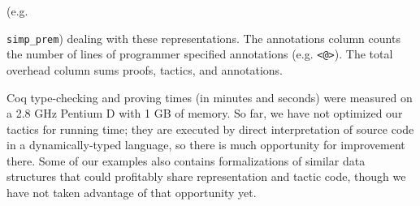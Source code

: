 \documentclass[preprint,nocopyrightspace]{sigplanconf}
\newcommand{\cd}[1]{\texttt{#1}}
\begin{document}
(e.g. {\cd{simp\_prem}) dealing with these representations.
The annotations column counts the number of lines of
programmer specified annotations (e.g. \cd{<@>}).  The total
overhead column sums proofs, tactics, and annotations.


Coq type-checking and proving times (in minutes and seconds) were measured
on a 2.8 GHz Pentium D with 1 GB of memory.  So far, we have not
optimized our tactics for running time; they are executed by direct
interpretation of source code in a dynamically-typed language, so
there is much opportunity for improvement there.  Some of our examples
also contains formalizations of similar data structures that could
profitably share representation and tactic code, though we have not
taken advantage of that opportunity yet.

}
\end{document}
